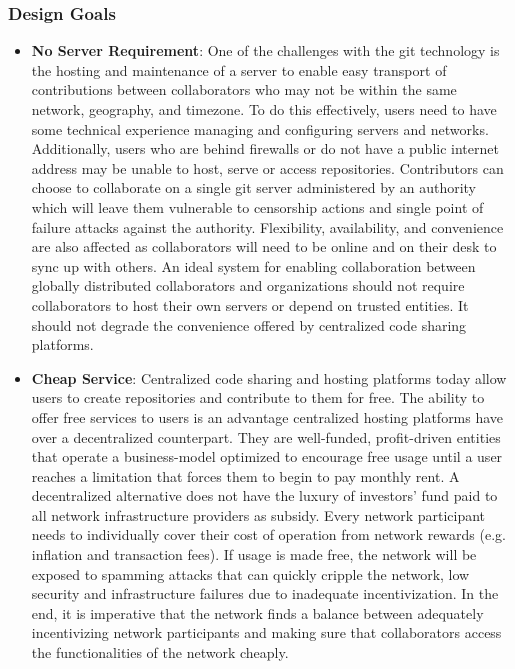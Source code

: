  \subsubsection{Design Goals}
 \label{sec:design_goals}
 \begin{itemize}
 	\item \textbf{No Server Requirement}: One of the challenges with the git technology is the hosting and maintenance of a server to enable easy transport of contributions between collaborators who may not be within the same network, geography, and timezone. To do this effectively, users need to have some technical experience managing and configuring servers and networks. Additionally, users who are behind firewalls or do not have a public internet address may be unable to host, serve or access repositories. Contributors can choose to collaborate on a single git server administered by an authority which will leave them vulnerable to censorship actions and single point of failure attacks against the authority. Flexibility, availability, and convenience are also affected as collaborators will need to be online and on their desk to sync up with others. An ideal system for enabling collaboration between globally distributed collaborators and organizations should not require collaborators to host their own servers or depend on trusted entities. It should not degrade the convenience offered by centralized code sharing platforms.
 	\item \textbf{Cheap Service}: Centralized code sharing and hosting platforms today allow users to create repositories and contribute to them for free. The ability to offer free services to users is an advantage centralized hosting platforms have over a decentralized counterpart. They are well-funded, profit-driven entities that operate a business-model optimized to encourage free usage until a user reaches a limitation that forces them to begin to pay monthly rent. A decentralized alternative does not have the luxury of investors’ fund paid to all network infrastructure providers as subsidy. Every network participant needs to individually cover their cost of operation from network rewards (e.g. inflation and transaction fees). If usage is made free, the network will be exposed to spamming attacks that can quickly cripple the network, low security and infrastructure failures due to inadequate incentivization. In the end, it is imperative that the network finds a balance between adequately incentivizing network participants and making sure that collaborators access the functionalities of the network cheaply.

\end{itemize}
